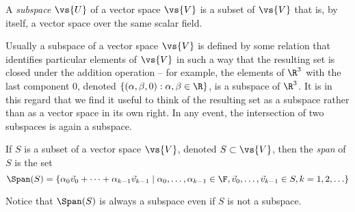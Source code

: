 \begin{definition}[Subspace]
A {\it subspace} $\vs{U}$ of a vector space $\vs{V}$ is a subset of $\vs{V}$ that is,
by itself, a vector space over the same scalar field.
\end{definition}

Usually a subspace of a vector space $\vs{V}$ is defined by some relation
that identifies particular elements of $\vs{V}$ in such a way that the
resulting set is closed under the addition operation -- for
example, the elements of $\R^3$ with the last component 0, denoted
$\{(\alpha, \beta, 0) : \alpha, \beta \in \R\}$, is a subspace of $\R^3$. 
It is in this regard that we find it useful to think of the resulting set as a 
subspace rather than as a vector space in its own right.  In any event, the
intersection of two subspaces is again a subspace. 

\begin{definition}[Span, n.]
If $S$ is a subset of a vector space $\vs{V}$, denoted $S \subset \vs{V}$, then
the {\it span} of $S$ is the set 
\[
\Span(S) = \left\{\alpha_0 \vec{v}_0 + \cdots + \alpha_{k-1} \vec{v}_{k-1} \;|\; %
                       \alpha_0,\ldots, \alpha_{k-1} \in \F, 
                       \vec{v}_0,\ldots, \vec{v}_{k-1} \in S, k = 1, 2, \ldots \right\}
\]
\end{definition}
Notice that $\Span(S)$ is always a subspace even if $S$ is not a subspace.  

